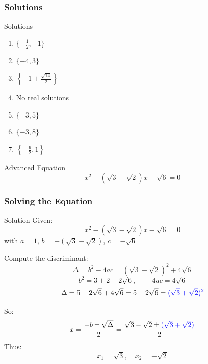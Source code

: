 \documentclass[10pt]{beamer}
\begin{document}
	\begin{frame}
		\frametitle{Solutions}
		\begin{exampleblock}{Solutions}
			\begin{enumerate}
				\item \( \{-\frac{1}{2}, -1\} \)
				\item \( \{-4, 3\} \)
				\item \( \left\{-1 \pm \frac{\sqrt{14}}{2}\right\} \)
				\item No real solutions
				\item \( \{-3, 5\} \)
				\item \( \{-3, 8\} \)
				\item \( \left\{-\frac{9}{2}, 1\right\} \)
			\end{enumerate}
		\end{exampleblock}
	\end{frame}
	
	\begin{frame}
		\begin{alertblock}{Advanced Equation}
			\[
			x^2 - (\sqrt{3} - \sqrt{2})x - \sqrt{6} = 0
			\]
		\end{alertblock}
	\end{frame}
	
	\begin{frame}
		\frametitle{Solving the Equation}
		\fontsize{9}{10}
		\begin{exampleblock}{Solution}
			Given:
			\[
			x^2 - (\sqrt{3} - \sqrt{2})x - \sqrt{6} = 0
			\]
			with \(a = 1\), \(b = -(\sqrt{3} - \sqrt{2})\), \(c = -\sqrt{6}\)
			
			Compute the discriminant:
			\[
			\Delta = b^2 - 4ac = (\sqrt{3} - \sqrt{2})^2 + 4\sqrt{6}
			\]
			\[
			b^2 = 3 + 2 - 2\sqrt{6}, \quad -4ac = 4\sqrt{6}
			\]
			\[
			\Delta = 5 - 2\sqrt{6} + 4\sqrt{6} = 5 + 2\sqrt{6} = \textcolor{blue}{(\sqrt{3} + \sqrt{2})^2}
			\]
			
			So:
			\[
			x = \frac{-b \pm \sqrt{\Delta}}{2} = \frac{\sqrt{3} - \sqrt{2} \pm \textcolor{blue}{(\sqrt{3} + \sqrt{2})}}{2}
			\]
			Thus:
			\[
			x_1 = \sqrt{3}, \quad x_2 = -\sqrt{2}
			\]
		\end{exampleblock}
	\end{frame}
	
	
	
\end{document}
